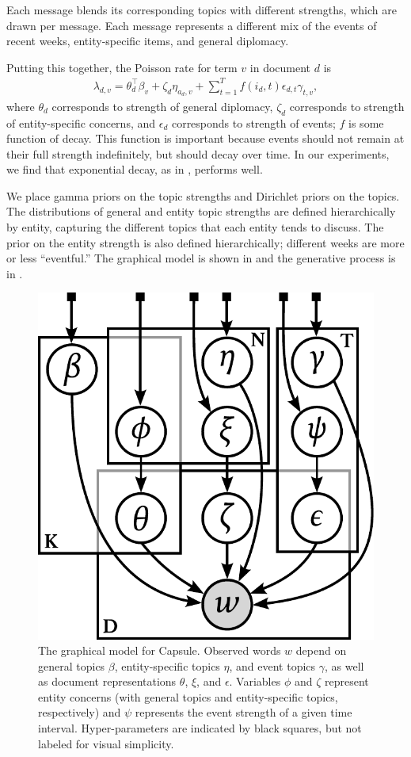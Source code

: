 Each message blends its corresponding topics with different
strengths, which are drawn per message. Each message represents a
different mix of the events of recent weeks, entity-specific items, and
general diplomacy.

Putting this together, the Poisson rate for term $v$ in document $d$ is
\begin{align}
  \lambda_{d,v} = \theta_d^\top\beta_v  + \zeta_d \eta_{a_d,v} + \sum_{t=1}^T f(i_d, t) \epsilon_{d,t} \gamma_{t,v},
\label{eq:poisrate}
\end{align} where $\theta_d$ corresponds to strength of general diplomacy, $\zeta_d$ corresponds to strength of entity-specific concerns, and $\epsilon_d$ corresponds to strength of events; $f$ is some function of decay.  This function is important because events should not remain at their full strength indefinitely, but should decay over time.  In our experiments, we find that exponential decay, as in , performs well.

We place gamma priors on the topic strengths and Dirichlet priors on
the topics. The distributions of general and entity topic strengths are defined
hierarchically by entity, capturing the different topics that each
entity tends to discuss.  The prior on the entity strength is
also defined hierarchically; different weeks are more or less
``eventful.'' The graphical model is shown in  and the generative process is in .

\begin{figure}[bt]
\centering
\includegraphics[width=0.5\linewidth]{fig/graphicalmodel.pdf}
\caption{The graphical model for Capsule.  Observed words $w$ depend on general topics $\beta$, entity-specific topics $\eta$, and event topics $\gamma$, as well as document representations $\theta$, $\xi$, and $\epsilon$.  Variables $\phi$ and $\zeta$ represent entity concerns (with general topics and entity-specific topics, respectively) and $\psi$ represents the event strength of a given time interval.  Hyper-parameters are indicated by black squares, but not labeled for visual simplicity.}
\label{fig:graphicalmodel}
\end{figure}


